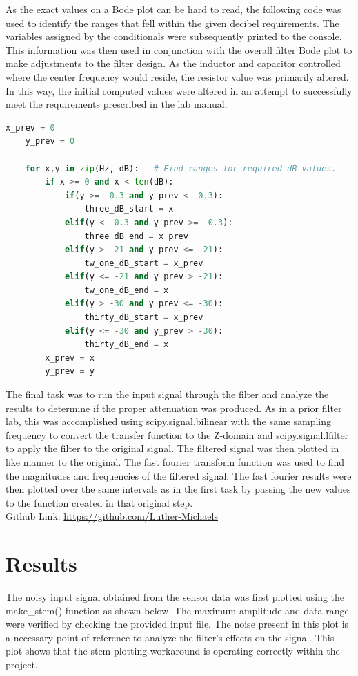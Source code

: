 \documentclass[12pt]{report}
\begin{document}
As the exact values on a Bode plot can be hard to read, the following code was used to identify the ranges that fell within the given decibel requirements. The variables assigned by the conditionals were subsequently printed to the console. This information was then used in conjunction with the overall filter Bode plot to make adjustments to the filter design. As the inductor and capacitor controlled where the center frequency would reside, the resistor value was primarily altered. In this way, the initial computed values were altered in an attempt to successfully meet the requirements prescribed in the lab manual. \\ 

\begin{lstlisting}[language=Python]
	x_prev = 0
	y_prev = 0

	for x,y in zip(Hz, dB):   # Find ranges for required dB values.
		if x >= 0 and x < len(dB): 
			if(y >= -0.3 and y_prev < -0.3):
				three_dB_start = x
			elif(y < -0.3 and y_prev >= -0.3):
				three_dB_end = x_prev
			elif(y > -21 and y_prev <= -21):
				tw_one_dB_start = x_prev    
			elif(y <= -21 and y_prev > -21):
				tw_one_dB_end = x
			elif(y > -30 and y_prev <= -30):
				thirty_dB_start = x_prev
			elif(y <= -30 and y_prev > -30):
				thirty_dB_end = x
		x_prev = x
		y_prev = y
\end{lstlisting}

The final task was to run the input signal through the filter and analyze the results to determine if the proper attenuation was produced. As in a prior filter lab, this was accomplished using scipy.signal.bilinear with the same sampling frequency to convert the transfer function to the Z-domain and scipy.signal.lfilter to apply the filter to the original signal. The filtered signal was then plotted in like manner to the original. The fast fourier transform function was used to find the magnitudes and frequencies of the filtered signal. The fast fourier results were then plotted over the same intervals as in the first task by passing the new values to the function created in that original step. \\

Github Link: \url{https://github.com/Luther-Michaels} \\

\section{Results}

The noisy input signal obtained from the sensor data was first plotted using the make\_stem() function as shown below. The maximum amplitude and data range were verified by checking the provided input file. The noise present in this plot is a necessary point of reference to analyze the filter's effects on the signal. This plot shows that the stem plotting workaround is operating correctly within the project. \\
\end{document}
